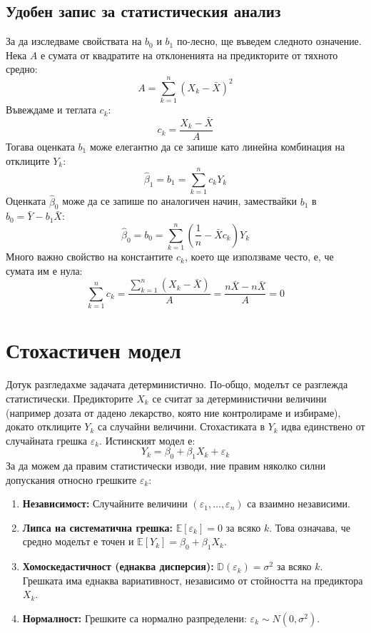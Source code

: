 \documentclass{article}
\begin{document}
\subsection{Удобен запис за статистическия анализ}
За да изследваме свойствата на $b_0$ и $b_1$ по-лесно, ще въведем следното означение. Нека $A$ е сумата от квадратите на отклоненията на предикторите от тяхното средно:
\[
A = \sum_{k=1}^n (X_k - \bar{X})^2
\]
Въвеждаме и теглата $c_k$:
\[
c_k = \frac{X_k - \bar{X}}{A}
\]
Тогава оценката $b_1$ може елегантно да се запише като линейна комбинация на отклиците $Y_k$:
\[
\hat{\beta}_1 = b_1 = \sum_{k=1}^n c_k Y_k
\]
Оценката $\hat{\beta}_0$ може да се запише по аналогичен начин, замествайки $b_1$ в $b_0 = \bar{Y} - b_1 \bar{X}$:
\[
\hat{\beta}_0 = b_0 = \sum_{k=1}^n \left( \frac{1}{n} - \bar{X} c_k \right) Y_k
\]
Много важно свойство на константите $c_k$, което ще използваме често, е, че сумата им е нула:
\[
\sum_{k=1}^n c_k = \frac{\sum_{k=1}^n (X_k - \bar{X})}{A} = \frac{n\bar{X} - n\bar{X}}{A} = 0
\]

\section{Стохастичен модел}

Дотук разгледахме задачата детерминистично. По-общо, моделът се разглежда статистически. Предикторите $X_k$ се считат за детерминистични величини (например дозата от дадено лекарство, която ние контролираме и избираме), докато отклиците $Y_k$ са случайни величини. Стохастиката в $Y_k$ идва единствено от случайната грешка $\varepsilon_k$. Истинският модел е:
\[
Y_k = \beta_0 + \beta_1 X_k + \varepsilon_k
\]
За да можем да правим статистически изводи, ние правим няколко силни допускания относно грешките $\varepsilon_k$:
\begin{enumerate}
    \item \textbf{Независимост:} Случайните величини $(\varepsilon_1, \dots, \varepsilon_n)$ са взаимно независими.
    \item \textbf{Липса на систематична грешка:} $\mathbb{E}[\varepsilon_k] = 0$ за всяко $k$. Това означава, че средно моделът е точен и $\mathbb{E}[Y_k] = \beta_0 + \beta_1 X_k$.
    \item \textbf{Хомоскедастичност (еднаква дисперсия):} $\mathbb{D}(\varepsilon_k) = \sigma^2$ за всяко $k$. Грешката има еднаква вариативност, независимо от стойността на предиктора $X_k$.
    \item \textbf{Нормалност:} Грешките са нормално разпределени: $\varepsilon_k \sim N(0, \sigma^2)$.
\end{enumerate}
\end{document}
